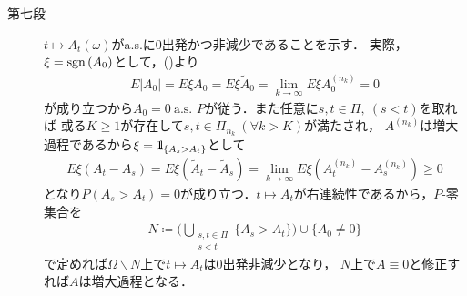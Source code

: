\begin{prf}
\begin{description}
			\item[第七段]
				$t \longmapsto A_t(\omega)$がa.s.に0出発かつ非減少であることを示す．
				実際，$\xi = \operatorname{sgn}\left( A_0 \right)$として，()より
				\begin{align}
					E |A_0| = E \xi A_0 = E \xi \tilde{A}_0 = \lim_{k \to \infty} E \xi A^{(n_k)}_0 = 0
				\end{align}
				が成り立つから$A_0 = 0\ \mbox{a.s. $P$}$が従う．また任意に$s,t \in \Pi,\ (s<t)$を取れば
				或る$K \geq 1$が存在して$s,t \in \Pi_{n_k}\ (\forall k > K)$が満たされ，
				$A^{(n_k)}$は増大過程であるから$\xi = \mbox{1}\hspace{-0.25em}\mbox{l}_{\{A_s > A_t\}}$として
				\begin{align}
					E \xi (A_t - A_s) = E \xi \left( \tilde{A}_t - \tilde{A}_s \right)
					= \lim_{k \to \infty} E \xi \left( A^{(n_k)}_t - A^{(n_k)}_s \right) \geq 0 
				\end{align}
				となり$P(A_s > A_t) = 0$が成り立つ．$t \longmapsto A_t$が右連続性であるから，$P$-零集合を
				\begin{align}
					N \coloneqq \Biggl(\bigcup_{\substack{s,t \in \Pi \\ s < t}} \{A_s > A_t\}\Biggr) \cup \{A_0 \neq 0\}
				\end{align}
				で定めれば$\Omega \backslash N$上で$t \longmapsto A_t$は0出発非減少となり，
				$N$上で$A \equiv 0$と修正すれば$A$は増大過程となる．
				

\end{description}
\end{prf}

